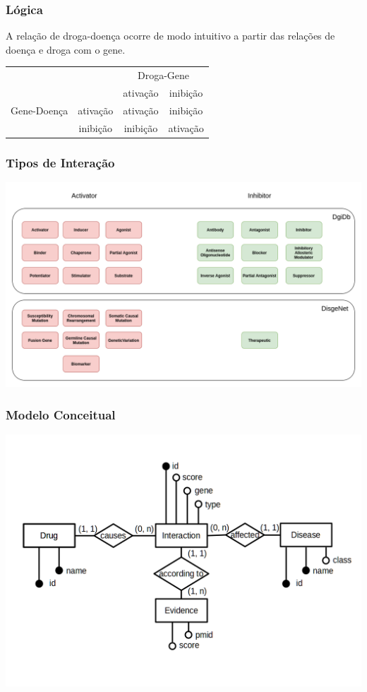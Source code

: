 \documentclass[12pt]{beamer}
\begin{document}
\begin{frame}[fragile]
  \frametitle{Lógica}

  A relação de droga-doença ocorre de modo intuitivo a partir das relações de
  doença e droga com o gene.

  \vspace*{0.1cm}

  \begin{tabular}{| c c | c c |}
    \hline
    & & \multicolumn{2}{c|}{Droga-Gene} \\
    & & ativação & inibição \\
    \hline
    Gene-Doença & ativação & ativação & inibição \\
    & inibição & inibição & ativação \\
    \hline
  \end{tabular}

\end{frame}

\begin{frame}[fragile]
  \frametitle{Tipos de Interação}

  \centering
  \includegraphics[scale=0.29]{diagram.png}
\end{frame}

\begin{frame}[fragile]
  \frametitle{Modelo Conceitual}
  \centering
  \includegraphics[scale=0.275]{conceitual.png}
\end{frame}
\end{document}
